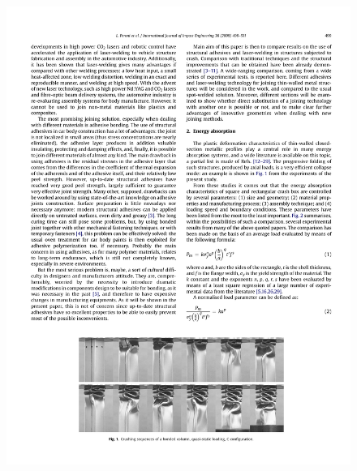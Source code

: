 \documentclass[cmfonts]{witpress}
\begin{document}
\begin{figure}
\begin{minipage}[b]{.23\linewidth}
		\includegraphics[width=\linewidth]{figures/IMG_CUTRES/peroni_trig}
	\end{minipage}
	\quad
	\begin{minipage}[b]{.45\linewidth}
		\centering

\end{minipage}
\end{figure}
\end{document}

